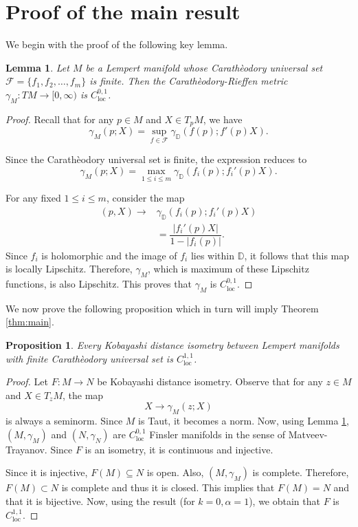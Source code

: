 \documentclass[12pt]{amsart}
\numberwithin{equation}{section}
\newtheorem{lemma}[theorem]{Lemma}
\newtheorem{proposition}[theorem]{Proposition}
\theoremstyle{remark}
\begin{document}
\section{Proof of the main result}


We begin with the proof of the following key lemma.

\begin{lemma}\label{lem:connect}
Let $M$ be a Lempert manifold whose Carath\`{e}odory universal set 
$\mathcal{F}=\{f_1,f_2,\ldots,f_m\}$ is finite. Then the  Carath\`{e}odory-Rieffen 
metric $\gamma_M:TM\to [0,\infty)$ is $C_{\text{loc}}^{0,1}$.
\end{lemma}

\begin{proof}
	Recall that  for any $p\in M$ and $X\in T_pM$, we have 
	$$\gamma_M(p;X)=\sup_{f\in \mathcal{F}}\gamma_{\mathbb{D}}(f(p);f'(p)X).$$
	
	Since the Carath\`{e}odory universal set is finite, the expression reduces to 
		$$\gamma_M(p;X)=\max_{1\leq i\leq m}\gamma_{\mathbb{D}}(f_i(p);f_i'(p)X).$$
		
		For any fixed $1\leq i\leq m$,  consider the map 
		\begin{align*}(p,X)\to& \gamma_{\mathbb{D}}(f_i(p);f_i'(p)X)\\
			& =\dfrac{|f_i'(p)X|}{1-|f_i(p)|}.			
		\end{align*}
	Since $f_i$ is holomorphic and the image of $f_i$ lies within $\mathbb{D}$, it follows that 
	this map is locally Lipschitz. Therefore, $\gamma_M$, which is maximum of these Lipschitz 
	functions, is also Lipschitz. This proves that $\gamma_M$ is $C_{\text{loc}}^{0,1}$.
\end{proof}

We now prove the following proposition which in turn will imply Theorem \ref{thm:main}.

 \begin{proposition}\label{prop:connect}
	Every Kobayashi distance isometry between Lempert manifolds with finite 
	Carath\`{e}odory universal set is $C_{\text{loc}}^{1,1}$.
\end{proposition}

\begin{proof}
	Let $F:M\to N$ be Kobayashi distance isometry. Observe that for any $z\in M$ and 
	$X\in T_zM$, the map
	$$X\to \gamma_M(z;X)$$ is always a seminorm. Since $M$ is Taut, it becomes a norm.
	 Now, using Lemma \ref{lem:connect}, 
	$(M,\gamma_M)$ and $(N,\gamma_N)$ are $C_{\text{loc}}^{0,1}$ Finsler manifolds in 
	the sense of Matveev-Trayanov. Since $F$ is an isometry, it is continuous and injective. 
	
	Since it is injective, $F(M)\subseteq N$ is open. Also, $(M,\gamma_{M})$ is complete. Therefore, 
	$F(M)\subset N$ is complete and thus it is closed. This implies that $F(M)=N$ and 
	that it is bijective.  Now, using the result \cite[~Corollary C]{matveev} (for $k=0, \alpha =1$), we obtain that 
	$F$ is $C_{\text{loc}}^{1,1}$.  
\end{proof}
\end{document}
